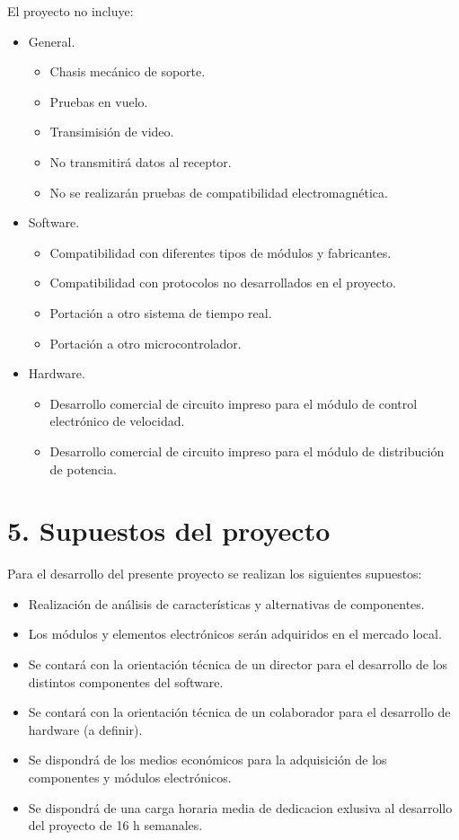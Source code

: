 \documentclass[
11pt, %
]{charter}
\begin{document}
	El proyecto no incluye:
	\begin{itemize}
		\item General.
		    \begin{itemize}
			    \item Chasis mec\'anico de soporte.
			    \item Pruebas en vuelo. 
			    \item Transimisi\'on de video.
			    \item No transmitir\'a datos al receptor.
			    \item No se realizar\'an pruebas de compatibilidad electromagn\'etica. 
		    \end{itemize}
		\item Software.
		 	\begin{itemize}
				\item Compatibilidad con diferentes tipos de m\'odulos y fabricantes.
			    \item Compatibilidad con protocolos no desarrollados en el proyecto.
			    \item Portaci\'on a otro sistema de tiempo real.
			    \item Portaci\'on a otro microcontrolador.
		    \end{itemize}
		\item Hardware.
		 	\begin{itemize}
				\item Desarrollo comercial de circuito impreso para el m\'odulo de control electr\'onico de velocidad. 
		    	\item Desarrollo comercial de circuito impreso para el m\'odulo de distribuci\'on de potencia.
		    \end{itemize}		
	\end{itemize}




\section{5. Supuestos del proyecto}
\label{sec:supuestos}


	Para el desarrollo del presente proyecto se realizan los siguientes supuestos:

	\begin{itemize}
		\item Realizaci\'on de an\'alisis de caracter\'isticas y alternativas de componentes.
		\item Los m\'odulos y elementos electr\'onicos ser\'an adquiridos en el mercado local.
		\item Se contar\'a con la orientaci\'on t\'ecnica de un director para el desarrollo de los distintos componentes del software.
		\item Se contar\'a con la orientaci\'on t\'ecnica de un colaborador para el desarrollo de hardware (a definir).
		\item Se dispondr\'a de los medios econ\'omicos para la adquisici\'on de los componentes y m\'odulos electr\'onicos. 
		\item Se dispondr\'a de una carga horaria media de dedicacion exlusiva al desarrollo del proyecto de 16 h semanales. 
	\end{itemize}
\end{document}
